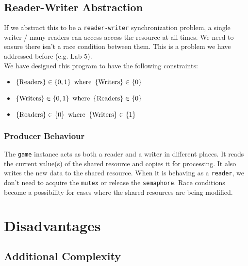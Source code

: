 \documentclass{article}
\begin{document}
\subsection{Reader-Writer Abstraction}
If we abstract this to be a \texttt{reader-writer} synchronization problem, a single writer / many readers can access access the resource at all times.
We need to ensure there isn't a race condition between them. This is a problem we have addressed before (e.g. Lab 5). \\

We have designed this program to have the following constraints:

\begin{itemize}
    \item $\{ \text{Readers} \} \in \{ 0, 1 \} \hspace{5px} \text{where} \hspace{5px} \{ \text{Writers} \} \in \{ 0 \}$
    \item $\{ \text{Writers} \} \in \{ 0, 1 \} \hspace{5px} \text{where} \hspace{5px} \{ \text{Readers} \} \in \{ 0 \}$
    \item $\{ \text{Readers} \} \in \{ 0 \} \hspace{5px} \text{where} \hspace{5px} \{ \text{Writers} \} \in \{ 1 \}$
\end{itemize}

\subsubsection{Producer Behaviour}

The \texttt{game} instance acts as both a reader and a writer in different places. It reads the current value(s) of the shared resource and copies it for processing. It also writes the new data to the shared resource.
When it is behaving as a \texttt{reader}, we don't need to acquire the \texttt{mutex} or release the \texttt{semaphore}. Race conditions become a possibility for cases where the shared resources are being modified.

\section{Disadvantages}


\subsection{Additional Complexity}
\end{document}
